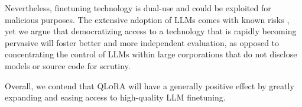 Nevertheless, finetuning technology is dual-use and could be exploited for malicious purposes. The extensive adoption of LLMs comes with known risks \citep{bommasani2021opportunities,bender2021dangers}, yet we argue that democratizing access to a technology that is rapidly becoming pervasive will foster better and more independent evaluation, as opposed to concentrating the control of LLMs within large corporations that do not disclose models or source code for scrutiny.

Overall, we contend that \textsc{QLoRA} will have a generally positive effect by greatly expanding and easing access to high-quality LLM finetuning.

